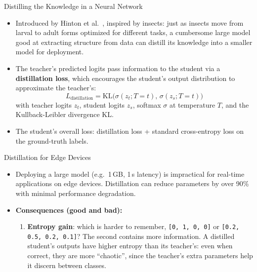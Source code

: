\begin{frame}{Distilling the Knowledge in a Neural Network}
\small%
\begin{itemize}
  \item Introduced by Hinton et al.\ , inspired by insects: just as insects move from larval to adult forms optimized for different tasks, a cumbersome large model good at extracting structure from data can distill its knowledge into a smaller model for deployment.
  \item The teacher's predicted logits pass information to the student via a \textbf{distillation loss}, which encourages the student's output distribution to approximate the teacher's:
  $$L_{\text{distillation}} = \mathrm{KL}\big(\sigma(z_t; T=t),\, \sigma(z_s; T=t)\big)$$
  with teacher logits $z_t$, student logits $z_s$, softmax $\sigma$ at temperature $T$, and the Kullback-Leibler divergence KL.
  \item The student's overall loss: distillation loss + standard cross-entropy loss on the ground-truth labels.
\end{itemize}
\end{frame}

\begin{frame}{Distillation for Edge Devices}
\begin{itemize}
  \item Deploying a large model (e.g.\ 1\,GB, 1\,s latency) is impractical for real-time applications on edge devices. Distillation can reduce parameters by over 90\% with minimal performance degradation.
  \item \textbf{Consequences (good and bad):}
  \begin{enumerate}
    \item \textbf{Entropy gain}: which is harder to remember, \texttt{[0, 1, 0, 0]} or \texttt{[0.2, 0.5, 0.2, 0.1]}? The second contains more information. A distilled student's outputs have higher entropy than its teacher's: even when correct, they are more \enquote{chaotic}, since the teacher's extra parameters help it discern between classes.
  \end{enumerate}
\end{itemize}
\end{frame}

